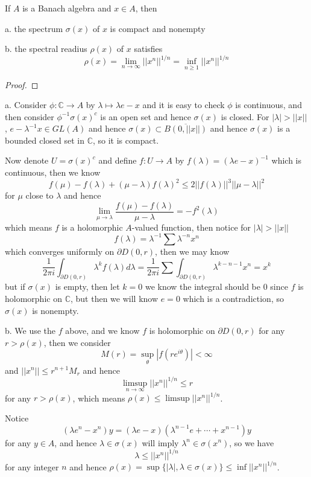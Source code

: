 \documentclass[lang=en, color=blue, ]{elegantbook}
\newcommand{\C}{\mathbb{C}}
\begin{document}
\begin{theorem}
    If $A$ is a Banach algebra and $x\in A$, then\par
    a. the spectrum $\sigma(x)$ of $x$ is compact and nonempty\par
    b. the spectral readius $\rho(x)$ of $x$ satisfies
    \[\rho(x) = \lim_{n\to\infty} ||x^n||^{1/n} = \inf_{n\geq 1} ||x^n||^{1/n}\]
\end{theorem}
\begin{proof}
    
\end{proof}
    a. Consider $\phi:\C \to A$ by $\lambda\mapsto \lambda e-x$ and it is easy to check $\phi$ is continuous, and then consider $\phi^{-1}{\sigma(x)^c}$ is an open set and hence $\sigma(x)$ is closed. For $|\lambda| > ||x||$, $e- \lambda^{-1}x \in GL(A)$ and hence $\sigma(x) \subset \overline{B(0,||x||)}$ and hence $\sigma(x)$ is a bounded closed set in $\C$, so it is compact.\par
    Now denote $ U = \sigma(x)^c$ and define $f:U \to A$ by $f(\lambda) = (\lambda e -x)^{-1}$ which is continuous, then we know
    \[f(\mu) - f(\lambda) + (\mu-\lambda)f(\lambda)^2  \leq 2||f(\lambda)||^3||\mu-\lambda||^2\]
    for $\mu$ close to $\lambda$ and hence
    \[\lim_{\mu\to\lambda} \dfrac{f(\mu)-f(\lambda)}{\mu-\lambda} = - f^2(\lambda)\]
    which means $f$ is a holomorphic $A$-valued function, then notice for $|\lambda| > ||x||$
    \[
    f(\lambda) = \lambda^{-1} \sum \lambda^{-n}x^n
    \]
    which converges uniformly on $\partial D(0,r)$, then we may know
    \[
    \dfrac{1}{2\pi i}\int_{\partial D(0,r)} \lambda^k f(\lambda) d\lambda= \dfrac{1}{2\pi i} \sum \int_{\partial D(0,r)} \lambda^{k-n-1}x^n = x^k
    \]
    but if $\sigma(x)$ is empty, then let $k = 0$ we know the integral should be $0$ since $f$ is holomorphic on $\C$, but then we will know $e = 0$ which is a contradiction, so $\sigma(x)$ is nonempty.\par
    b. We use the $f$ above, and we know $f$ is holomorphic on $\partial D(0,r)$ for any $r>\rho(x)$, then we consider
    \[M(r) = \sup_{\theta}|f(re^{i\theta})| < \infty\]
    and $||x^n||\leq r^{n+1}M_r$ and hence
    \[\limsup_{n\to\infty} ||x^n||^{1/n} \leq r\]
    for any $r> \rho(x)$, which means $\rho(x) \leq \limsup ||x^n||^{1/n}$.\par
    Notice
    \[(\lambda e^n - x^n)y = (\lambda e -x)(\lambda^{n-1} e +\cdots + x^{n-1})y\]
    for any $y\in A$, and hence $\lambda \in \sigma(x)$ will imply $\lambda^n \in \sigma(x^n)$, so we have
    \[\lambda \leq ||x^n||^{1/n}\]
    for any integer $n$ and hence $\rho(x) = \sup\{|\lambda|, \lambda \in \sigma(x)\} \leq \inf ||x^n||^{1/n}$.
\end{document}
